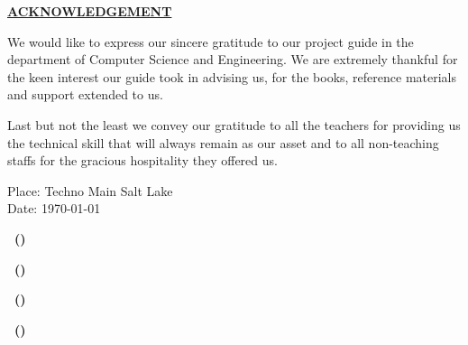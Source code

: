 \thispagestyle{plain}

\begin{center}
 \Large {\bf \uppercase {\underline {Acknowledgement}}}
\end{center}

\vspace{3\baselineskip}

\noindent
We would like to express our sincere gratitude to our project guide in the department of Computer Science and Engineering. We are extremely thankful for the keen interest our guide took in advising us, for the books, reference materials and support extended to us.


\vspace{\baselineskip}
\noindent
Last but not the least we convey our gratitude to all the teachers for providing us the technical skill that will always remain as our asset and to all non-teaching staffs for the gracious hospitality they offered us.

\vspace{\baselineskip}
\noindent
Place: Techno Main Salt Lake \\
Date: \today


\hspace{1.0\baselineskip}

\begin{flushright}

\vspace{2\baselineskip}
\textbf{\mynameone ~(\myrollnoone)}

\vspace{2\baselineskip}
\textbf{\mynametwo ~(\myrollnotwo)}

\vspace{2\baselineskip}
\textbf{\mynamethree ~(\myrollnothree)}

\vspace{2\baselineskip}
\textbf{\mynamefour ~(\myrollnofour)}

\end{flushright}


